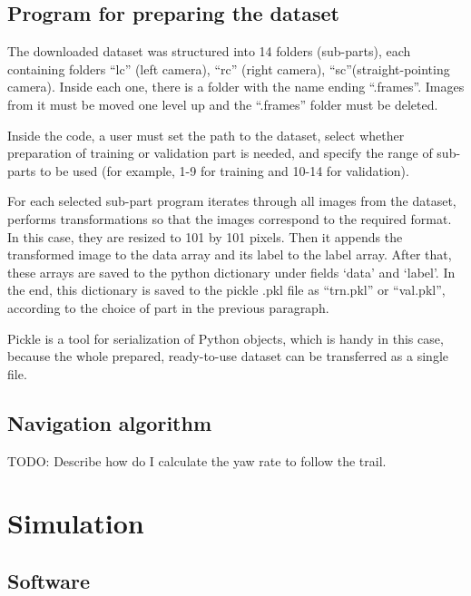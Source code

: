 \section{Program for preparing the dataset}

The downloaded dataset was structured into 14 folders (sub-parts), each containing folders “lc” (left camera), “rc” (right camera), “sc”(straight-pointing camera). Inside each one, there is a folder with the name ending “.frames”. Images from it must be moved one level up and the “.frames” folder must be deleted. 

Inside the code, a user must set the path to the dataset, select whether preparation of training or validation part is needed, and specify the range of sub-parts to be used (for example, 1-9 for training and 10-14 for validation).

For each selected sub-part program iterates through all images from the dataset, performs transformations so that the images correspond to the required format. In this case, they are resized to 101 by 101 pixels. Then it appends the transformed image to the data array and its label to the label array. After that, these arrays are saved to the python dictionary under fields ‘data’ and ‘label’. In the end, this dictionary is saved to the pickle .pkl file as “trn.pkl” or “val.pkl”, according to the choice of part in the previous paragraph.

Pickle is a tool for serialization of Python objects, which is handy in this case, because the whole prepared, ready-to-use dataset can be transferred as a single file.

\section{Navigation algorithm}
TODO: Describe how do I calculate the yaw rate to follow the trail.





\chapter{Simulation}



\section{Software}


